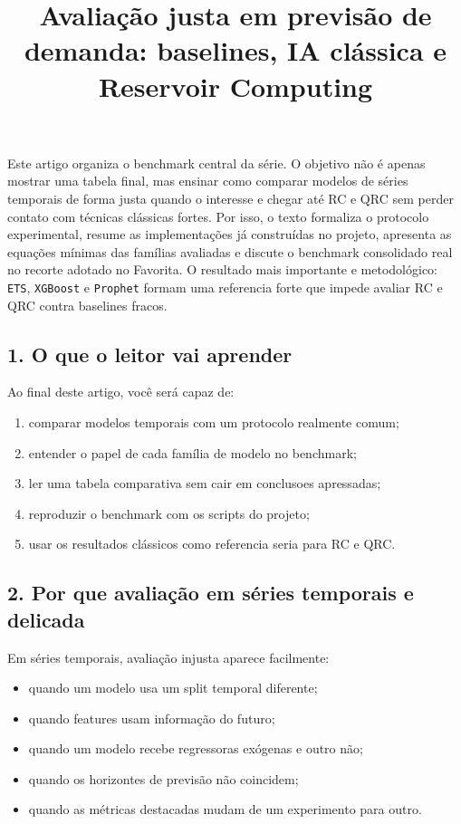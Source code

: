 \documentclass[12pt]{article}
\title{Avaliação justa em previsão de demanda: baselines, IA clássica e Reservoir Computing}
\author{}
\providecommand{\tightlist}{%
  \setlength{\itemsep}{0pt}\setlength{\parskip}{0pt}}
\begin{document}
\maketitle

\begin{resumo}
Este artigo organiza o benchmark central da série. O objetivo não é apenas mostrar uma tabela final, mas ensinar como comparar modelos de séries temporais de forma justa quando o interesse e chegar até RC e QRC sem perder contato com técnicas clássicas fortes. Por isso, o texto formaliza o protocolo experimental, resume as implementações já construídas no projeto, apresenta as equações mínimas das famílias avaliadas e discute o benchmark consolidado real no recorte adotado no Favorita. O resultado mais importante e metodológico: \texttt{ETS}, \texttt{XGBoost} e \texttt{Prophet} formam uma referencia forte que impede avaliar RC e QRC contra baselines fracos.
\end{resumo}

\subsection{1. O que o leitor vai aprender}\label{1-o-que-o-leitor-vai-aprender}

Ao final deste artigo, você será capaz de:

\begin{enumerate}
\def\labelenumi{\arabic{enumi}.}
\tightlist
\item
  comparar modelos temporais com um protocolo realmente comum;
\item
  entender o papel de cada família de modelo no benchmark;
\item
  ler uma tabela comparativa sem cair em conclusoes apressadas;
\item
  reproduzir o benchmark com os scripts do projeto;
\item
  usar os resultados clássicos como referencia seria para RC e QRC.
\end{enumerate}

\subsection{2. Por que avaliação em séries temporais e delicada}\label{2-por-que-avaliauxe7uxe3o-em-suxe9ries-temporais-e-delicada}

Em séries temporais, avaliação injusta aparece facilmente:

\begin{itemize}
\tightlist
\item
  quando um modelo usa um split temporal diferente;
\item
  quando features usam informação do futuro;
\item
  quando um modelo recebe regressoras exógenas e outro não;
\item
  quando os horizontes de previsão não coincidem;
\item
  quando as métricas destacadas mudam de um experimento para outro.
\end{itemize}
\end{document}
